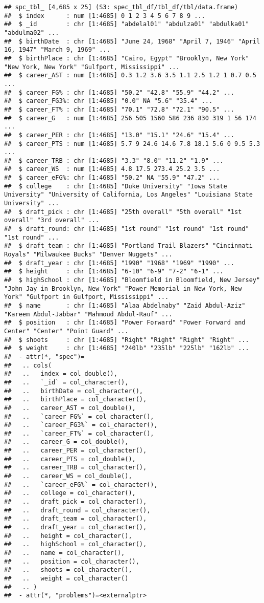 \documentclass[
]{book}
\begin{document}
\begin{verbatim}
## spc_tbl_ [4,685 x 25] (S3: spec_tbl_df/tbl_df/tbl/data.frame)
##  $ index      : num [1:4685] 0 1 2 3 4 5 6 7 8 9 ...
##  $ _id        : chr [1:4685] "abdelal01" "abdulza01" "abdulka01" "abdulma02" ...
##  $ birthDate  : chr [1:4685] "June 24, 1968" "April 7, 1946" "April 16, 1947" "March 9, 1969" ...
##  $ birthPlace : chr [1:4685] "Cairo, Egypt" "Brooklyn, New York" "New York, New York" "Gulfport, Mississippi" ...
##  $ career_AST : num [1:4685] 0.3 1.2 3.6 3.5 1.1 2.5 1.2 1 0.7 0.5 ...
##  $ career_FG% : chr [1:4685] "50.2" "42.8" "55.9" "44.2" ...
##  $ career_FG3%: chr [1:4685] "0.0" NA "5.6" "35.4" ...
##  $ career_FT% : chr [1:4685] "70.1" "72.8" "72.1" "90.5" ...
##  $ career_G   : num [1:4685] 256 505 1560 586 236 830 319 1 56 174 ...
##  $ career_PER : chr [1:4685] "13.0" "15.1" "24.6" "15.4" ...
##  $ career_PTS : num [1:4685] 5.7 9 24.6 14.6 7.8 18.1 5.6 0 9.5 5.3 ...
##  $ career_TRB : chr [1:4685] "3.3" "8.0" "11.2" "1.9" ...
##  $ career_WS  : num [1:4685] 4.8 17.5 273.4 25.2 3.5 ...
##  $ career_eFG%: chr [1:4685] "50.2" NA "55.9" "47.2" ...
##  $ college    : chr [1:4685] "Duke University" "Iowa State University" "University of California, Los Angeles" "Louisiana State University" ...
##  $ draft_pick : chr [1:4685] "25th overall" "5th overall" "1st overall" "3rd overall" ...
##  $ draft_round: chr [1:4685] "1st round" "1st round" "1st round" "1st round" ...
##  $ draft_team : chr [1:4685] "Portland Trail Blazers" "Cincinnati Royals" "Milwaukee Bucks" "Denver Nuggets" ...
##  $ draft_year : chr [1:4685] "1990" "1968" "1969" "1990" ...
##  $ height     : chr [1:4685] "6-10" "6-9" "7-2" "6-1" ...
##  $ highSchool : chr [1:4685] "Bloomfield in Bloomfield, New Jersey" "John Jay in Brooklyn, New York" "Power Memorial in New York, New York" "Gulfport in Gulfport, Mississippi" ...
##  $ name       : chr [1:4685] "Alaa Abdelnaby" "Zaid Abdul-Aziz" "Kareem Abdul-Jabbar" "Mahmoud Abdul-Rauf" ...
##  $ position   : chr [1:4685] "Power Forward" "Power Forward and Center" "Center" "Point Guard" ...
##  $ shoots     : chr [1:4685] "Right" "Right" "Right" "Right" ...
##  $ weight     : chr [1:4685] "240lb" "235lb" "225lb" "162lb" ...
##  - attr(*, "spec")=
##   .. cols(
##   ..   index = col_double(),
##   ..   `_id` = col_character(),
##   ..   birthDate = col_character(),
##   ..   birthPlace = col_character(),
##   ..   career_AST = col_double(),
##   ..   `career_FG%` = col_character(),
##   ..   `career_FG3%` = col_character(),
##   ..   `career_FT%` = col_character(),
##   ..   career_G = col_double(),
##   ..   career_PER = col_character(),
##   ..   career_PTS = col_double(),
##   ..   career_TRB = col_character(),
##   ..   career_WS = col_double(),
##   ..   `career_eFG%` = col_character(),
##   ..   college = col_character(),
##   ..   draft_pick = col_character(),
##   ..   draft_round = col_character(),
##   ..   draft_team = col_character(),
##   ..   draft_year = col_character(),
##   ..   height = col_character(),
##   ..   highSchool = col_character(),
##   ..   name = col_character(),
##   ..   position = col_character(),
##   ..   shoots = col_character(),
##   ..   weight = col_character()
##   .. )
##  - attr(*, "problems")=<externalptr>
\end{verbatim}
\end{document}
